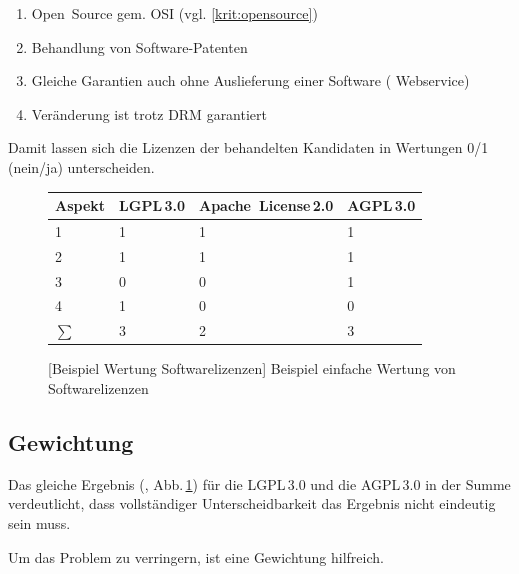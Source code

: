 
\begin{enumerate} \setlength\itemsep{0em}\setlength\parskip{0em}\setlength\topsep{0em}\setlength\partopsep{0em}\setlength\parsep{0em}
\item Open~Source gem. OSI (vgl. \ref{krit:opensource})
\item Behandlung von Software-Patenten
\item Gleiche Garantien auch ohne Auslieferung einer Software (\zB{} Webservice)
\item Veränderung ist trotz \gls{DRM} garantiert
\end{enumerate}

Damit lassen sich die Lizenzen der behandelten Kandidaten in Wertungen 0/1 (nein/ja) unterscheiden.

\begin{figure}[!htp]
\centering
\begin{tabular}{l|lll}
Aspekt	& LGPL\,3.0 	& Apache~License\,2.0 & AGPL\,3.0 \\
\hline
\hline
1 		& 1	& 1	& 1	\\
\hline
2 		& 1	& 1	& 1	\\
\hline
3 		& 0	& 0	& 1	\\
\hline
4		& 1 & 0 & 0 \\
\hline
\hline
\(\sum\)& 3 & 2 & 3 \\
\end{tabular}
[Beispiel Wertung Softwarelizenzen]{\label{abb:wertung:oss} Beispiel einfache Wertung von Softwarelizenzen}
\end{figure}

\subsection{Gewichtung}

Das gleiche Ergebnis (, Abb.\,\ref{abb:wertung:oss}) für die LGPL\,3.0 und die AGPL\,3.0 in der Summe verdeutlicht,
dass vollständiger Unterscheidbarkeit das Ergebnis nicht eindeutig sein muss.

Um das Problem zu verringern, ist eine Gewichtung hilfreich.

